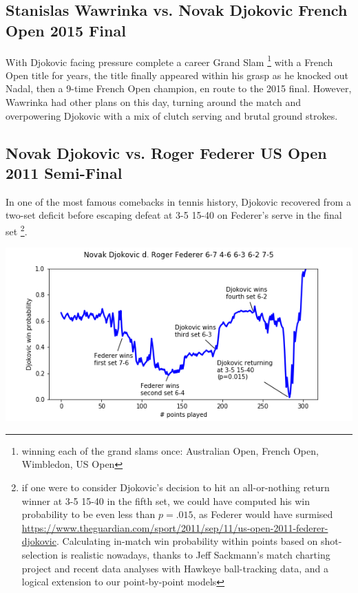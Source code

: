\documentclass[chapterprefix=false]{report}
\begin{document}
\subsection{Stanislas Wawrinka vs. Novak Djokovic French Open 2015 Final}

With Djokovic facing pressure complete a career Grand Slam \footnote{winning each of the grand slams once: Australian Open, French Open, Wimbledon, US Open} with a French Open title for years, the title finally appeared within his grasp as he knocked out Nadal, then a 9-time French Open champion, en route to the 2015 final. However, Wawrinka had other plans on this day, turning around the match and overpowering Djokovic with a mix of clutch serving and brutal ground strokes.


\subsection{Novak Djokovic vs. Roger Federer US Open 2011 Semi-Final}

In one of the most famous comebacks in tennis history, Djokovic recovered from a two-set deficit before escaping defeat at 3-5 15-40 on Federer's serve in the final set \footnote{if one were to consider Djokovic's decision to hit an all-or-nothing return winner at 3-5 15-40 in the fifth set, we could have computed his win probability to be even less than $p=.015$, as Federer would have surmised \url{https://www.theguardian.com/sport/2011/sep/11/us-open-2011-federer-djokovic}. Calculating in-match win probability within points based on shot-selection is realistic nowadays, thanks to Jeff Sackmann's match charting project and recent data analyses with Hawkeye ball-tracking data, and a logical extension to our point-by-point models}.

\includegraphics[scale=.7]{djokovic_federer_uso_11}






\end{document}
